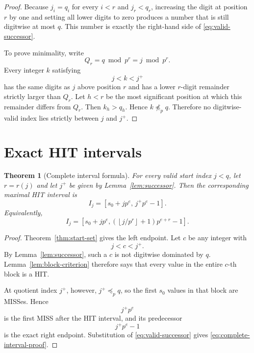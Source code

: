 \documentclass[11pt,a4paper]{article}
\newtheorem{theorem}{Theorem}[section]
\theoremstyle{definition}
\theoremstyle{remark}
\newcommand{\floor}[1]{\left\lfloor #1\right\rfloor}
\begin{document}
\begin{proof}
Because $j_i=q_i$ for every $i<r$ and $j_r<q_r$, increasing the digit at position $r$ by one and setting all lower digits to zero produces a number that is still digitwise at most $q$.  This number is exactly the right-hand side of \eqref{eq:valid-successor}.

To prove minimality, write
\[
Q_r=q\bmod p^r=j\bmod p^r.
\]
Every integer $k$ satisfying
\[
j<k<j^+
\]
has the same digits as $j$ above position $r$ and has a lower $r$-digit remainder strictly larger than $Q_r$.  Let $h<r$ be the most significant position at which this remainder differs from $Q_r$.  Then $k_h>q_h$.  Hence $k\not\preceq_p q$.  Therefore no digitwise-valid index lies strictly between $j$ and $j^+$.
\end{proof}

\section{Exact HIT intervals}

\begin{theorem}[Complete interval formula]
\label{thm:exact-interval}
For every valid start index $j<q$, let $r=r(j)$ and let $j^+$ be given by Lemma~\ref{lem:successor}.  Then the corresponding maximal HIT interval is
\begin{equation}
\boxed{
 I_j=[s_0+jp^e,\,j^+p^e-1].
}
\label{eq:interval-successor}
\end{equation}
Equivalently,
\begin{equation}
\boxed{
 I_j=
 \left[
 s_0+jp^e,
 \left(\floor{j/p^r}+1\right)p^{e+r}-1
 \right].
}
\label{eq:complete-interval-proof}
\end{equation}
\end{theorem}

\begin{proof}
Theorem~\ref{thm:start-set} gives the left endpoint.  Let $c$ be any integer with
\[
j<c<j^+.
\]
By Lemma~\ref{lem:successor}, such a $c$ is not digitwise dominated by $q$.  Lemma~\ref{lem:block-criterion} therefore says that every value in the entire $c$-th block is a HIT.

At quotient index $j^+$, however, $j^+\preceq_p q$, so the first $s_0$ values in that block are MISSes.  Hence
\[
j^+p^e
\]
is the first MISS after the HIT interval, and its predecessor
\[
j^+p^e-1
\]
is the exact right endpoint.  Substitution of \eqref{eq:valid-successor} gives \eqref{eq:complete-interval-proof}.
\end{proof}
\end{document}
